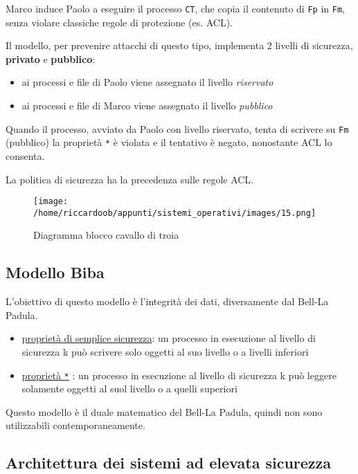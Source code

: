 Marco induce Paolo a eseguire il processo \texttt{CT}, che copia il contenuto di \texttt{Fp} in \texttt{Fm}, senza violare classiche regole di protezione (es. ACL).

Il modello, per prevenire attacchi di questo tipo, implementa 2 livelli di sicurezza, \textbf{privato} e \textbf{pubblico}:
\begin{itemize}
    \item ai processi e file di Paolo viene assegnato il livello \textit{riservato}
    \item ai processi e file di Marco viene assegnato il livello \textit{pubblico}
\end{itemize}

Quando il processo, avviato da Paolo con livello riservato, tenta di scrivere su \texttt{Fm} (pubblico) la proprietà \texttt{*} è violata e il tentativo è negato, nonostante ACL lo consenta.

La politica di sicurezza ha la precedenza sulle regole ACL.

\begin{figure}[H]
    \caption{Diagramma blocco cavallo di troia}
    \centering
    \texttt{[image: /home/riccardoob/appunti/sistemi\_operativi/images/15.png]}
\end{figure}

\subsection{Modello Biba}

L'obiettivo di questo modello è l'integrità dei dati, diversamente dal Bell-La Padula.

\begin{itemize}
    \item \underline{proprietà di semplice sicurezza}: un processo in esecuzione al livello di sicurezza k può scrivere solo oggetti al suo livello o a livelli inferiori
    \item \underline{proprietà \texttt{*}} : un processo in esecuzione al livello di sicurezza k può leggere solamente oggetti al suol livello o a quelli superiori
\end{itemize}

Questo modello è il duale matematico del Bell-La Padula, quindi non sono utilizzabili contemporaneamente.

\subsection{Architettura dei sistemi ad elevata sicurezza}

